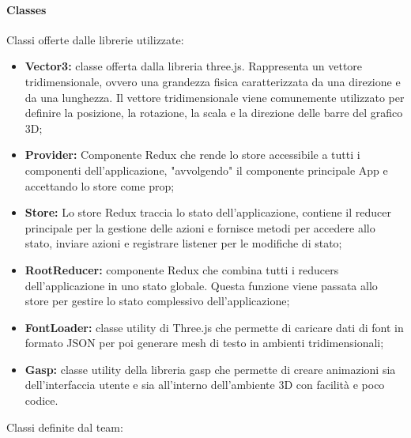 \paragraph{Classes}
    Classi offerte dalle librerie utilizzate:
    \begin{itemize}
        \item \textbf{Vector3:} classe offerta dalla libreria three.js. Rappresenta un vettore tridimensionale, ovvero
        una grandezza fisica caratterizzata da una direzione e da una lunghezza. Il vettore tridimensionale
        viene comunemente utilizzato per definire la posizione, la rotazione, la scala e la direzione
        delle barre del grafico 3D;
        \item \textbf{Provider:} Componente Redux che rende lo store accessibile a tutti i componenti dell'applicazione, "avvolgendo" il componente principale App e accettando lo store come prop;
        \item \textbf{Store:} Lo store Redux traccia lo stato dell'applicazione, contiene il reducer principale per la gestione delle azioni e fornisce metodi per accedere allo stato,
        inviare azioni e registrare listener per le modifiche di stato;
        \item \textbf{RootReducer:} componente Redux che combina tutti i reducers dell’applicazione in uno stato
        globale. Questa funzione viene passata allo store per gestire lo stato complessivo dell’applicazione;
        \item \textbf{FontLoader:} classe utility di Three.js che permette di caricare dati di font in formato JSON per poi generare mesh di testo in ambienti tridimensionali;
        \item \textbf{Gasp:} classe utility della libreria gasp che permette di creare animazioni sia dell'interfaccia utente e sia all'interno dell'ambiente 3D con facilità e poco codice.
    \end{itemize}
    Classi definite dal team:
